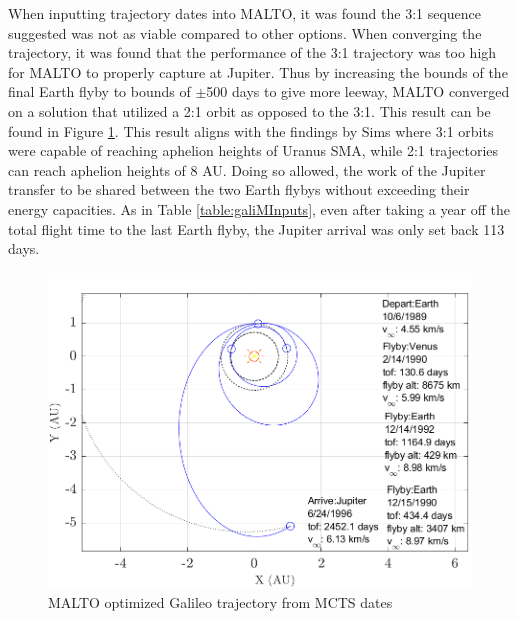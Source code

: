 \documentclass[letterpaper, preprint, paper,11pt]{AAS}	%
\begin{document}
When inputting trajectory dates into MALTO, it was found the 3:1 sequence suggested was not as viable compared to other options. When converging the trajectory, it was found that the performance of the 3:1 trajectory was too high for MALTO to properly capture at Jupiter. Thus by increasing the bounds of the final Earth flyby to bounds of $\pm$500 days to give more leeway, MALTO converged on a solution that utilized a 2:1 orbit as opposed to the 3:1. This result can be found in Figure \ref*{fig:galiMalto}. This result aligns with the findings by Sims \cite{sims1994} where 3:1 orbits were capable of reaching aphelion heights of Uranus SMA, while 2:1 trajectories can reach aphelion heights of 8 AU. Doing so allowed, the work of the Jupiter transfer to be shared between the two Earth flybys without exceeding their energy capacities. As in Table \ref*{table:galiMInputs}, even after taking a year off the total flight time to the last Earth flyby, the Jupiter arrival was only set back 113 days. 

\begin{figure}[h!]
    \centering
    \includegraphics[width = 5in]{./fig/galileoMalto.png}
    \caption{MALTO optimized Galileo trajectory from MCTS dates}
    \label{fig:galiMalto}
\end{figure}
\end{document}
